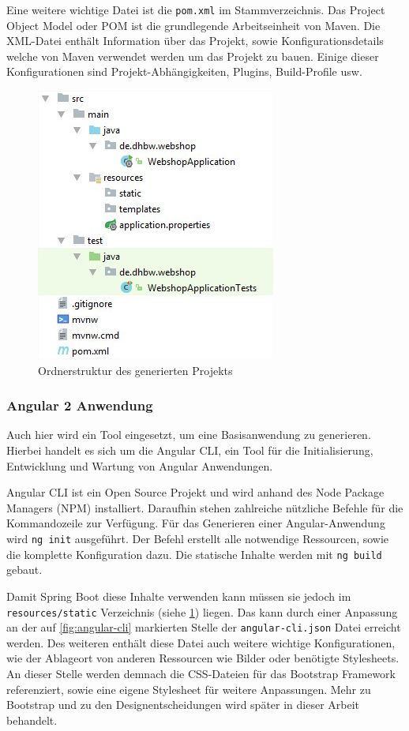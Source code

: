 Eine weitere wichtige Datei ist die \texttt{pom.xml} im Stammverzeichnis. Das Project Object Model oder \acs{POM} ist die grundlegende Arbeitseinheit von Maven. Die XML-Datei enthält Information über das Projekt, sowie Konfigurationsdetails welche von Maven verwendet werden um das Projekt zu bauen. Einige dieser Konfigurationen sind Projekt-Abhängigkeiten, Plugins, Build-Profile usw.\cite{Foundation2017}

\begin{figure}[th!]
	\centering
	\includegraphics[width=0.5\linewidth]{bilder/kap7/init-project}
	\caption{Ordnerstruktur des generierten Projekts}
	\label{fig:init-project}
\end{figure}

\subsubsection{Angular 2 Anwendung}
Auch hier wird ein Tool eingesetzt, um eine Basisanwendung zu generieren. Hierbei handelt es sich um die Angular CLI, ein Tool für die Initialisierung, Entwicklung und Wartung von Angular Anwendungen\cite{Arora2017}. 

Angular CLI ist ein Open Source Projekt und wird anhand des Node Package Managers (\acs{NPM}) installiert. Daraufhin stehen zahlreiche nützliche Befehle für die Kommandozeile zur Verfügung. Für das Generieren einer Angular-Anwendung wird \texttt{ng init} ausgeführt. Der Befehl erstellt alle notwendige Ressourcen, sowie die komplette Konfiguration dazu. Die statische Inhalte werden mit \texttt{ng build} gebaut. 

Damit Spring Boot diese Inhalte verwenden kann müssen sie jedoch im  \texttt{resources/static} Verzeichnis (siehe \cref{fig:init-project}) liegen. Das kann durch einer Anpassung an der auf \cref{fig:angular-cli} markierten Stelle  der \texttt{angular-cli.json} Datei erreicht werden. Des weiteren enthält diese Datei auch weitere wichtige Konfigurationen, wie der Ablageort von anderen Ressourcen wie Bilder oder benötigte Stylesheets. An dieser Stelle werden demnach die \acs{CSS}-Dateien für das Bootstrap Framework referenziert, sowie eine eigene Stylesheet für weitere Anpassungen. Mehr zu Bootstrap und zu den Designentscheidungen wird später in dieser Arbeit behandelt.

